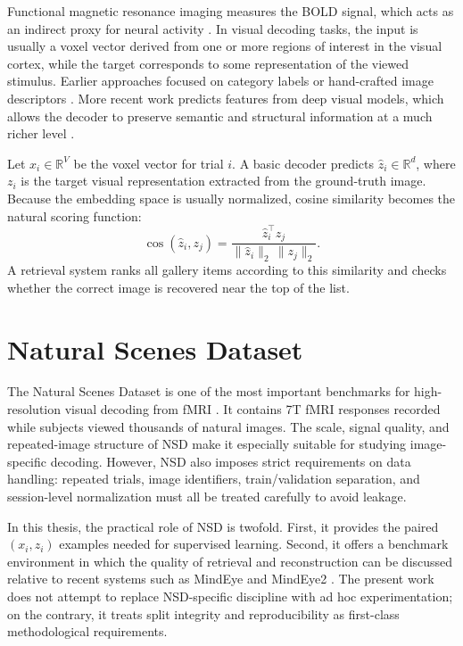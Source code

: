 Functional magnetic resonance imaging measures the BOLD signal, which acts as an indirect proxy for neural activity \cite{Allen2022,Wen2018}. In visual decoding tasks, the input is usually a voxel vector derived from one or more regions of interest in the visual cortex, while the target corresponds to some representation of the viewed stimulus. Earlier approaches focused on category labels or hand-crafted image descriptors \cite{Thirion2006,Kay2008,Naselaris2009}. More recent work predicts features from deep visual models, which allows the decoder to preserve semantic and structural information at a much richer level \cite{Horikawa2017,Wen2018,Scotti2023}.

Let $x_i \in \mathbb{R}^{V}$ be the voxel vector for trial $i$. A basic decoder predicts $\hat{z}_i \in \mathbb{R}^{d}$, where $z_i$ is the target visual representation extracted from the ground-truth image. Because the embedding space is usually normalized, cosine similarity becomes the natural scoring function:
\begin{equation}
\cos(\hat{z}_i, z_j) = \frac{\hat{z}_i^{\top} z_j}{\lVert \hat{z}_i \rVert_2 \, \lVert z_j \rVert_2}.
\label{eq:cosine_similarity}
\end{equation}
A retrieval system ranks all gallery items according to this similarity and checks whether the correct image is recovered near the top of the list.

\section{Natural Scenes Dataset}

The Natural Scenes Dataset is one of the most important benchmarks for high-resolution visual decoding from fMRI \cite{Allen2022}. It contains 7T fMRI responses recorded while subjects viewed thousands of natural images. The scale, signal quality, and repeated-image structure of NSD make it especially suitable for studying image-specific decoding. However, NSD also imposes strict requirements on data handling: repeated trials, image identifiers, train/validation separation, and session-level normalization must all be treated carefully to avoid leakage.

In this thesis, the practical role of NSD is twofold. First, it provides the paired $(x_i, z_i)$ examples needed for supervised learning. Second, it offers a benchmark environment in which the quality of retrieval and reconstruction can be discussed relative to recent systems such as MindEye and MindEye2 \cite{Scotti2023,Scotti2024}. The present work does not attempt to replace NSD-specific discipline with ad hoc experimentation; on the contrary, it treats split integrity and reproducibility as first-class methodological requirements.

